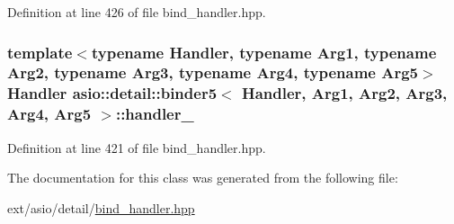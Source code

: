 Definition at line 426 of file bind\+\_\+handler.\+hpp.

\hypertarget{classasio_1_1detail_1_1binder5_a9dd44f3c00833f6ce5971abb8b5c65ee}{}
\subsubsection[{handler\+\_\+}]{\setlength{\rightskip}{0pt plus 5cm}template$<$typename Handler, typename Arg1, typename Arg2, typename Arg3, typename Arg4, typename Arg5$>$ Handler {\bf asio\+::detail\+::binder5}$<$ Handler, Arg1, Arg2, Arg3, Arg4, Arg5 $>$\+::handler\+\_\+}\label{classasio_1_1detail_1_1binder5_a9dd44f3c00833f6ce5971abb8b5c65ee}


Definition at line 421 of file bind\+\_\+handler.\+hpp.



The documentation for this class was generated from the following file\+:\begin{DoxyCompactItemize}
\item 
ext/asio/detail/\hyperlink{bind__handler_8hpp}{bind\+\_\+handler.\+hpp}\end{DoxyCompactItemize}
